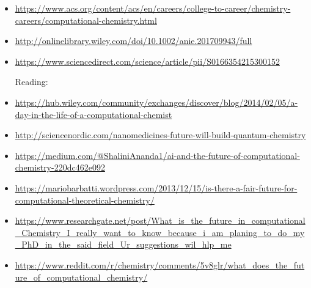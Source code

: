 \begin{itemize}
	\item \href{https://www.acs.org/content/acs/en/careers/college-to-career/chemistry-careers/computational-chemistry.html}{https://www.acs.org/content/acs/en/careers/college-to-career/chemistry-careers/computational-chemistry.html}

	\item \href{http://onlinelibrary.wiley.com/doi/10.1002/anie.201709943/full}{http://onlinelibrary.wiley.com/doi/10.1002/anie.201709943/full}

	\item \href{https://www.sciencedirect.com/science/article/pii/S0166354215300152}{https://www.sciencedirect.com/science/article/pii/S0166354215300152}

Reading:

	\item \href{https://hub.wiley.com/community/exchanges/discover/blog/2014/02/05/a-day-in-the-life-of-a-computational-chemist}{https://hub.wiley.com/community/exchanges/discover/blog/2014/02/05/a-day-in-the-life-of-a-computational-chemist}

	\item \href{http://sciencenordic.com/nanomedicines-future-will-build-quantum-chemistry}{http://sciencenordic.com/nanomedicines-future-will-build-quantum-chemistry}

	\item \href{https://medium.com/@ShaliniAnanda1/ai-and-the-future-of-computational-chemistry-220dc462e092}{https://medium.com/@ShaliniAnanda1/ai-and-the-future-of-computational-chemistry-220dc462e092}

	\item \href{https://mariobarbatti.wordpress.com/2013/12/15/is-there-a-fair-future-for-computational-theoretical-chemistry/}{https://mariobarbatti.wordpress.com/2013/12/15/is-there-a-fair-future-for-computational-theoretical-chemistry/}

	\item \href{https://www.researchgate.net/post/What\_is\_the\_future\_in\_computational\_Chemistry\_I\_really\_want\_to\_know\_because\_i\_am\_planing\_to\_do\_my\_PhD\_in\_the\_said\_field\_Ur\_suggestions\_wil\_hlp\_me}{https://www.researchgate.net/post/What\_is\_the\_future\_in\_computational\_Chemistry\_I\_really\_want\_to\_know\_because\_i\_am\_planing\_to\_do\_my\_PhD\_in\_the\_said\_field\_Ur\_suggestions\_wil\_hlp\_me}

	\item \href{https://www.reddit.com/r/chemistry/comments/5v8glr/what\_does\_the\_future\_of\_computational\_chemistry/}{https://www.reddit.com/r/chemistry/comments/5v8glr/what\_does\_the\_future\_of\_computational\_chemistry/}


\end{itemize}
